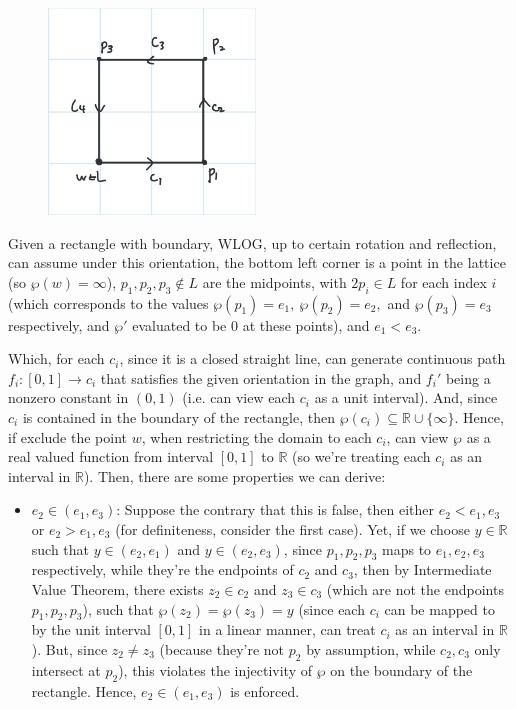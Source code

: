 \documentclass{article}
\begin{document}
\begin{itemize}
    \begin{figure}[h!]
        \begin{center}
            \includegraphics*[width=55mm]{image 2.jpg}
        \end{center}
    \end{figure}

    Given a rectangle with boundary, WLOG, up to certain rotation and reflection, can assume under this orientation, the bottom left corner is a point in the lattice (so $\wp(w)=\infty$), $p_1,p_2,p_3\notin L$ are the midpoints, with $2p_i\in L$ for each index $i$ (which corresponds to the values $\wp(p_1)=e_1,\ \wp(p_2)=e_2,$ and $\wp(p_3)=e_3$ respectively, and $\wp'$ evaluated to be $0$ at these points), and $e_1<e_3$.

    Which, for each $c_i$, since it is a closed straight line, can generate continuous path $f_i:[0,1]\rightarrow c_i$ that satisfies the given orientation in the graph, and $f_i'$ being a nonzero constant in $(0,1)$ (i.e. can view each $c_i$ as a unit interval). And, since $c_i$ is contained in the boundary of the rectangle, then $\wp(c_i)\subseteq \mathbb{R}\cup\{\infty\}$. Hence, if exclude the point $w$, when restricting the domain to each $c_i$, can view $\wp$ as a real valued function from interval $[0,1]$ to $\mathbb{R}$ (so we're treating each $c_i$ as an interval in $\mathbb{R}$). Then, there are some properties we can derive:
    \begin{itemize}
        \item $e_2\in (e_1,e_3)$: Suppose the contrary that this is false, then either $e_2<e_1,e_3$ or $e_2>e_1,e_3$ (for definiteness, consider the first case). Yet, if we choose $y\in\mathbb{R}$ such that $y\in (e_2,e_1)$ and $y\in (e_2,e_3)$, since $p_1,p_2,p_3$ maps to $e_1,e_2,e_3$ respectively, while they're the endpoints of $c_2$ and $c_3$, then by Intermediate Value Theorem, there exists $z_2\in c_2$ and $z_3\in c_3$ (which are not the endpoints $p_1,p_2,p_3$), such that $\wp(z_2)=\wp(z_3)=y$ (since each $c_i$ can be mapped to by the unit interval $[0,1]$ in a linear manner, can treat $c_i$ as an interval in $\mathbb{R}$). But, since $z_2\neq z_3$ (because they're not $p_2$ by assumption, while $c_2,c_3$ only intersect at $p_2$), this violates the injectivity of $\wp$ on the boundary of the rectangle.
        Hence, $e_2\in (e_1,e_3)$ is enforced.


\end{itemize}
\end{itemize}
\end{document}
